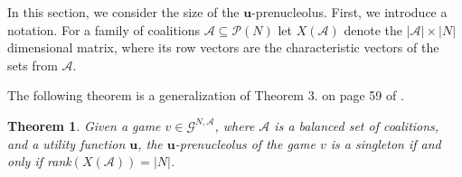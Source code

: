 \documentclass[a4paper,12pt]{article}
\newtheorem{theorem}{Theorem}
\theoremstyle{definition}
\theoremstyle{remark}
\begin{document}
In this section, we consider the size of the $\mathbf{u}$-prenucleolus. First, we introduce a notation. For a family of coalitions $\mathcal{A} \subseteq \mathcal{P} (N)$ let $X(\mathcal{A})$ denote the $|\mathcal{A}| \times |N|$ dimensional matrix, where its row vectors are the characteristic vectors of the sets from $\mathcal{A}$.

The following theorem is a generalization of Theorem 3. on page 59 of \citet{Katsev2013}.

\begin{theorem}
Given a game $v \in \mathcal{G}^{N,\mathcal{A}}$, where $\mathcal{A}$ is a balanced set of coalitions, and a utility function $\mathbf{u}$, the $\mathbf{u}$-prenucleolus of the game $v$ is a singleton if and only if rank$(X(\mathcal{A})) = |N|$.
\end{theorem}
\end{document}
